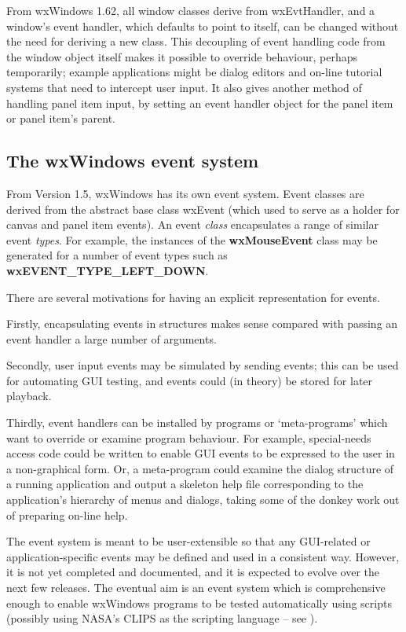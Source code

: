 From wxWindows 1.62, all window classes derive from wxEvtHandler, and a
window's event handler, which defaults to point to itself, can be changed
without the need for deriving a new class.
This decoupling of event handling code from the window object itself
makes it possible to override behaviour, perhaps temporarily; example
applications might be dialog editors and on-line tutorial systems
that need to intercept user input. It also gives another method of
handling panel item input, by setting an event handler object for the
panel item or panel item's parent.

\subsection{The wxWindows event system}

From Version 1.5, wxWindows has its own event system. Event classes are
derived from the abstract base class wxEvent (which used to serve as a
holder for canvas and panel item events). An event {\it class}
encapsulates a range of similar event {\it types}. For example, the
instances of the {\bf wxMouseEvent} class may be generated for a number
of event types such as {\bf wxEVENT\_TYPE\_LEFT\_DOWN}.

There are several motivations for having an explicit representation
for events.

Firstly, encapsulating events in structures makes sense compared
with passing an event handler a large number of arguments.

Secondly, user input events may be simulated by sending events; this can
be used for automating GUI testing, and events could (in theory) be
stored for later playback. 

Thirdly, event handlers can be installed by programs or `meta-programs'
which want to override or examine program behaviour. For example, special-needs
access code could be written to enable GUI events to be expressed to the
user in a non-graphical form. Or, a meta-program could examine the
dialog structure of a running application and output a skeleton help file
corresponding to the application's hierarchy of menus and dialogs, taking
some of the donkey work out of preparing on-line help.


The event system is meant to be user-extensible so that any GUI-related
or application-specific events may be defined and used in a consistent
way. However, it is not yet completed and documented, and it is expected
to evolve over the next few releases. The eventual aim is an event
system which is comprehensive enough to enable wxWindows programs to be
tested automatically using scripts (possibly using NASA's CLIPS as the
scripting language -- see ).

